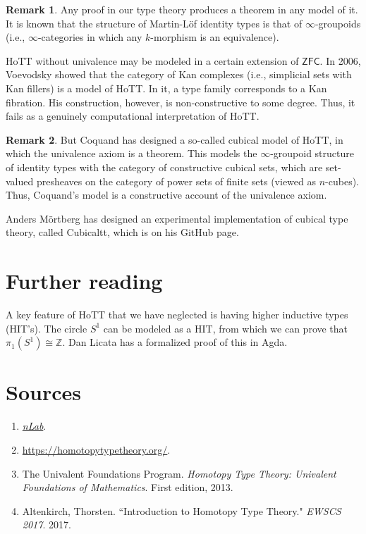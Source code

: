 \documentclass[10pt,letterpaper,cm]{nupset}
\theoremstyle{definition}
\newtheorem{remark}{Remark}
\newcommand{\Z}{\mathbb Z}
\newcommand{\1}{\mathbf{1}}
\newcommand{\0}{\vec 0}
\begin{document}
\begin{remark} Any proof in our type theory produces a theorem in any model of it. It is known that the structure of Martin-L\"of identity types is that of $\infty$-groupoids (i.e., $\infty$-categories in which any $k$-morphism is an equivalence).

HoTT without univalence may be modeled in a certain extension of $\mathsf{ZFC}$. In 2006, Voevodsky showed that the category of Kan complexes (i.e., simplicial sets with Kan fillers) is a model of HoTT.  In it, a type family corresponds to a Kan fibration.  His construction, however, is non-constructive to some degree. Thus, it fails as a genuinely computational interpretation of HoTT.
\end{remark}

\begin{remark}
But Coquand has designed a so-called cubical model of HoTT, in which the univalence axiom is a theorem. This models the $\infty$-groupoid structure of identity types with the category of constructive cubical sets, which are set-valued presheaves on the category of power sets of finite sets (viewed as $n$-cubes). Thus, Coquand's model is a constructive account of the univalence axiom.  

Anders M\"ortberg has designed an experimental implementation of cubical type theory, called Cubicaltt, which is on his GitHub page.
\end{remark}

\section*{Further reading}

A key feature of HoTT that we have neglected is having higher inductive types (HIT's). The circle $S^1$ can be modeled as a HIT, from which we can prove that $\pi_1(S^1) \cong \Z$. Dan Licata has a formalized proof of this in Agda.

\section*{Sources}

\begin{enumerate}
\item \href{https://ncatlab.org/nlab/show/HomePage}{\textit{nLab}}.
\item \url{https://homotopytypetheory.org/}.
\item The Univalent Foundations Program. \textit{Homotopy Type Theory: Univalent Foundations of Mathematics}. First edition, 2013.
\item Altenkirch, Thorsten. ``Introduction to Homotopy Type Theory." \textit{EWSCS 2017}. 2017.
\end{enumerate}
\end{document}

